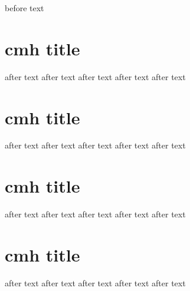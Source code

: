 before text

\section{cmh title}

after text
after text
after text
after text
after text
\section{cmh title}

after text
after text
after text
after text
after text
\section{cmh title}

after text
after text
after text
after text
after text
\section{cmh title}

after text
after text
after text
after text
after text
